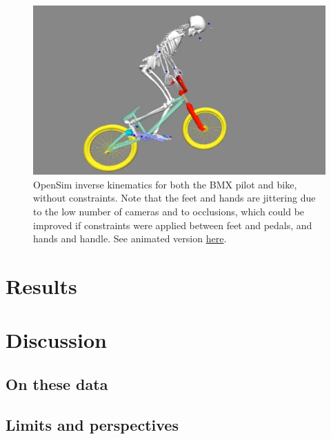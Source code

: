 \begin{figure}[hbtp]
	\centering
	\def\svgwidth{1\columnwidth}
	\fontsize{10pt}{10pt}\selectfont
	\includegraphics[width=\linewidth]{"../Chap7/Figures/BMXPilot.png"}
	\caption{OpenSim inverse kinematics for both the BMX pilot and bike, without constraints. Note that the feet and hands are jittering due to the low number of cameras and to occlusions, which could be improved if constraints were applied between feet and pedals, and hands and handle. See animated version \href{https://github.com/perfanalytics/pose2sim/blob/main/Content/Activities_verylow.gif}{here}.}
	\label{fig_bmxpilot}
\end{figure}




\section{Results}



\section{Discussion}
\subsection{On these data}


\subsection{Limits and perspectives}

